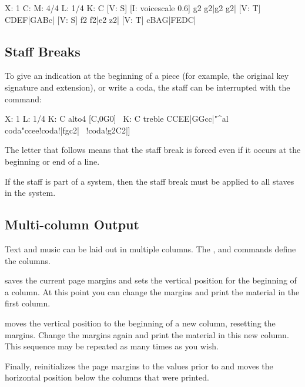 \documentclass[a4paper,12pt]{book}
\begin{document}
\begin{abcsource}
X: 1
C: 
M: 4/4
L: 1/4
K: C
%
[V: S] [I: voicescale 0.6] g2 g2|g2 g2|
[V: T] CDEF|GABc|
[V: S] f2 f2|e2 z2|
[V: T] cBAG|FEDC|
\end{abcsource}



\subsection{Staff Breaks}

To give an indication at the beginning of a piece (for example, the
original key signature and extension), or write a coda, the staff can
be interrupted with the  command:

\begin{abcsource}
X: 1
L: 1/4
K: C alto4
%
[C,0G0]\
K: C treble
CCEE|GGcc|"^al coda"ccee!coda!|fgc2|\
!coda!g2C2|]
\end{abcsource}


The letter  that follows  means that the
staff break is forced even if it occurs at the beginning or end of a
line.

If the staff is part of a system, then the staff break must be applied
to all staves in the system.


\subsection{Multi-column Output}
\label{sec:multicol}

Text and music can be laid out in multiple columns. The
,  and \metacmd{multicol
end} commands define the columns.

 saves the current page margins and sets the
vertical position for the beginning of a column. At this point you can
change the margins and print the material in the first column.

 moves the vertical position to the beginning of
a new column, resetting the margins. Change the margins again and
print the material in this new column. This sequence may be repeated
as many times as you wish.

Finally,  reinitializes the page margins to the
values prior to  and moves the horizontal
position below the columns that were printed.
\end{document}
